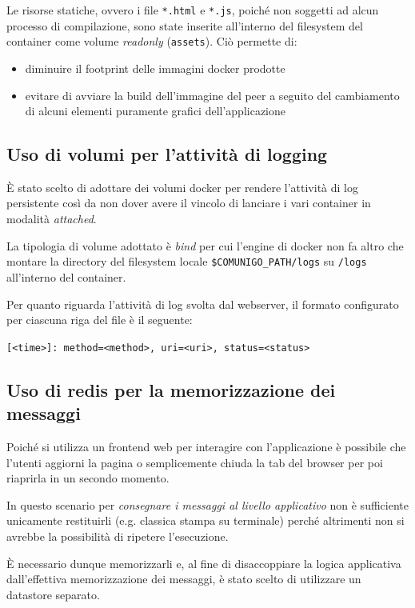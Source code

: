 \documentclass[conference]{IEEEtran}
\begin{document}
Le risorse statiche, ovvero i file \texttt{*.html} e \texttt{*.js}, poiché non soggetti ad alcun processo di compilazione, sono state inserite all'interno del filesystem del container come volume \textit{readonly} (\texttt{assets}). Ciò permette di:
\begin{itemize}
\item diminuire il footprint delle immagini docker prodotte
\item evitare di avviare la build dell'immagine del peer a seguito del cambiamento di alcuni elementi puramente grafici dell'applicazione
\end{itemize}

\subsection{Uso di volumi per l'attività di logging}
È stato scelto di adottare dei volumi docker per rendere l'attività di log persistente così da non dover avere il vincolo di lanciare i vari container in modalità \textit{attached}.

La tipologia di volume adottato è \textit{bind} per cui l'engine di docker non fa altro che montare la directory del filesystem locale \texttt{\$COMUNIGO\_PATH/logs} su \texttt{/logs} all'interno del container.

Per quanto riguarda l'attività di log svolta dal webserver, il formato configurato per ciascuna riga del file è il seguente:

\centerline{\scriptsize\texttt{[<time>]: method=<method>, uri=<uri>, status=<status>}}

\subsection{Uso di redis per la memorizzazione dei messaggi}
Poiché si utilizza un frontend web per interagire con l'applicazione è possibile che l'utenti aggiorni la pagina o semplicemente chiuda la tab del browser per poi riaprirla in un secondo momento.

In questo scenario per \textit{consegnare i messaggi al livello applicativo} non è sufficiente unicamente restituirli (e.g. classica stampa su terminale) perché altrimenti non si avrebbe la possibilità di ripetere l'esecuzione.

È necessario dunque memorizzarli e, al fine di disaccoppiare la logica applicativa dall'effettiva memorizzazione dei messaggi, è stato scelto di utilizzare un datastore separato.
\end{document}
